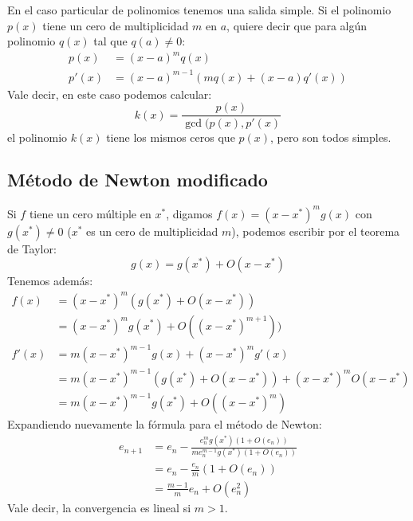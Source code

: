   En el caso particular de polinomios
  tenemos una salida simple.
  Si el polinomio \(p(x)\) tiene un cero de multiplicidad \(m\) en \(a\),
  quiere decir que para algún polinomio \(q(x)\) tal que \(q(a) \ne 0\):
  \begin{align*}
    p(x)
      &= (x - a)^m q(x) \\
    p'(x)
      &= (x - a)^{m - 1} (m q(x) + (x - a) q'(x))
  \end{align*}
  Vale decir,
  en este caso podemos calcular:
  \begin{equation*}
    k(x)
      = \frac{p(x)}{\gcd(p(x), p'(x)}
    \end{equation*}
    el polinomio \(k(x)\) tiene los mismos ceros que \(p(x)\),
    pero son todos simples.

\subsection{Método de Newton modificado}
\label{sec:Newton-modificado}

  Si \(f\) tiene un cero múltiple en \(x^*\),
  digamos \(f(x) = (x - x^*)^m g(x)\)
  con \(g(x^*) \ne 0\)
  (\(x^*\) es un cero de multiplicidad \(m\)),
  podemos escribir por el teorema de Taylor:
  \begin{equation*}
    g(x)
      = g(x^*) + O(x - x^*)
  \end{equation*}
  Tenemos además:
  \begin{align*}
    f(x)
      &= (x - x^*)^m (g(x^*) + O(x - x^*)) \\
      &= (x - x^*)^m g(x^*) + O((x - x^*)^{m + 1})) \\
    f'(x)
      &= m (x - x^*)^{m - 1} g(x) + (x - x^*)^m g'(x) \\
      &= m (x - x^*)^{m - 1} (g(x^*) + O(x - x^*))
           + (x - x^*)^m O(x - x^*) \\
      &= m (x - x^*)^{m - 1} g(x^*) + O((x - x^*)^m)
  \end{align*}
  Expandiendo nuevamente la fórmula para el método de Newton:
  \begin{align*}
    e_{n + 1}
      &= e_n - \frac{e_n^m g(x^*) (1 + O(e_n))}
                    {m e_n^{m - 1} g(x^*) (1 + O(e_n))} \\
      &= e_n - \frac{e_n}{m} (1 + O(e_n)) \\
      &= \frac{m - 1}{m} e_n + O(e_n^2)
  \end{align*}
  Vale decir,
  la convergencia es lineal si \(m > 1\).

